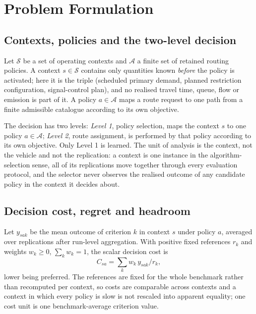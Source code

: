 \documentclass[runningheads]{llncs}
\begin{document}
\section{Problem Formulation}

\subsection{Contexts, policies and the two-level decision}

Let $\mathcal{S}$ be a set of operating contexts and $\mathcal{A}$ a finite set of
retained routing policies. A context $s\in\mathcal{S}$ contains only quantities known
\emph{before} the policy is activated; here it is the triple (scheduled primary demand,
planned restriction configuration, signal-control plan), and no realised travel time,
queue, flow or emission is part of it. A policy $a\in\mathcal{A}$ maps a route request to
one path from a finite admissible catalogue according to its own objective.

The decision has two levels: \emph{Level 1}, policy selection, maps the context $s$ to one
policy $a\in\mathcal{A}$; \emph{Level 2}, route assignment, is performed by that policy
according to its own objective. Only Level 1 is learned. The unit of analysis is the context, not the vehicle and not the
replication: a context is one instance in the algorithm-selection sense, all of its
replications move together through every evaluation protocol, and the selector never
observes the realised outcome of any candidate policy in the context it decides about.

\subsection{Decision cost, regret and headroom}

Let $y_{sak}$ be the mean outcome of criterion $k$ in context $s$ under policy $a$,
averaged over replications after run-level aggregation. With positive fixed references
$r_k$ and weights $w_k\ge0$, $\sum_k w_k=1$, the scalar decision cost is
\begin{equation}
C_{sa}=\sum_k w_k\,y_{sak}/r_k ,
\label{eq:cost}
\end{equation}
lower being preferred. The references are fixed for the whole benchmark rather than
recomputed per context, so costs are comparable across contexts and a context in which
every policy is slow is not rescaled into apparent equality; one cost unit is one
benchmark-average criterion value.
\end{document}
